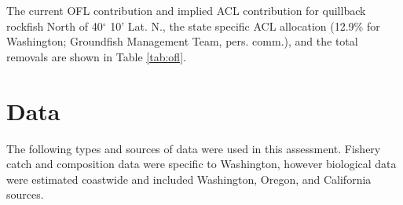 \documentclass[11pt,
  english,
  a4paper,
]{article}
\begin{document}
\leavevmode\tagmcend\tagstructend\par


The current OFL contribution and implied ACL contribution for quillback rockfish North of 40{\(^\circ\)\leavevmode\tagmcend\tagstructend} 10' Lat. N., the state specific ACL allocation (12.9\% for Washington; Groundfish Management Team, pers. comm.), and the total removals are shown in Table \ref{tab:ofl}.

\leavevmode\tagmcend\tagstructend\par


\hypertarget{data}{%
\section{Data}\label{data}}

\leavevmode\tagmcend\tagstructend


The following types and sources of data were used in this assessment. Fishery catch and composition data were specific to Washington, however biological data were estimated coastwide and included Washington, Oregon, and California sources.

\leavevmode\tagmcend\tagstructend\par

\end{document}
